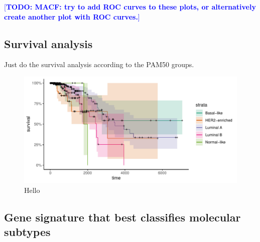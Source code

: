 \documentclass[10pt,twocolumn]{article}\usepackage[]{graphicx}\usepackage[]{color}
\makeatletter
\def\maxwidth{ %
  \ifdim\Gin@nat@width>\linewidth
    \linewidth
  \else
    \Gin@nat@width
  \fi
}
\newenvironment{knitrout}{}{} %
\newcommand{\todo}[1]{\textcolor{blue}{[\textbf{TODO: #1}]} }
\makeatother
\begin{document}
\todo{MACF: try to add ROC curves to these plots, or alternatively create another plot with ROC curves.}

\subsection{Survival analysis} %
Just do the survival analysis according to the PAM50 groups.

\begin{knitrout}
\color{fgcolor}\begin{figure}[ht]

{\centering \includegraphics[width=\maxwidth]{figure/survival-1} 

}

\caption[Hello]{Hello}\label{fig:survival}
\end{figure}


\end{knitrout}

\subsection{Gene signature that best classifies molecular subtypes} %
\end{document}
